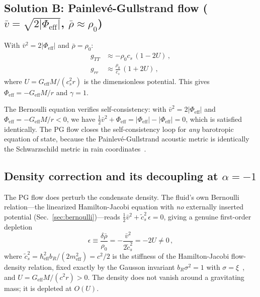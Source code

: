 \documentclass[12pt, a4paper]{article}
\newcommand{\Geff}{G_{\mathrm{eff}}}
\newcommand{\meff}{m_{\mathrm{eff}}}
\newcommand{\heff}{\hbar_{\mathrm{eff}}}
\newcommand{\rhob}{\bar{\rho}}
\newcommand{\vb}{\bar{v}}
\newcommand{\Phieff}{\Phi_{\mathrm{eff}}}
\begin{document}
\subsection{Solution B: Painlev\'{e}-Gullstrand flow \texorpdfstring{($\vb = \sqrt{2|\Phieff|}$, $\rhob \approx \rho_0$)}{(v = sqrt(2|Phi\_eff|), rho approx rho\_0)}}
\label{sec:solution_b}

With $\vb^2 = 2|\Phieff|$ and $\rhob = \rho_0$:
\begin{align}
    g_{TT} &\approx -\rho_0 c_s\,(1 - 2U)\,,\\
    g_{rr} &\approx \frac{\rho_0}{c_s}\,(1 + 2U)\,,
\end{align}
where $U = \Geff M/(c_s^2 r)$ is the dimensionless potential. This gives $\Phieff = -\Geff M/r$ and $\gamma = 1$.

The Bernoulli equation verifies self-consistency: with $\vb^2 = 2|\Phieff|$ and $\Phieff = -\Geff M/r < 0$, we have $\tfrac{1}{2}\vb^2 + \Phieff = |\Phieff| - |\Phieff| = 0$, which is satisfied identically. The PG flow closes the self-consistency loop for \emph{any} barotropic equation of state, because the Painlev\'{e}-Gullstrand acoustic metric is identically the Schwarzschild metric in rain coordinates~\cite{visser_1998,volovik_2003}.


\subsection{Density correction and its decoupling at \texorpdfstring{$\alpha=-1$}{alpha=-1}}
\label{sec:density_decoupling}

The PG flow does perturb the condensate density. The fluid's own Bernoulli relation---the linearized Hamilton-Jacobi equation with \emph{no} externally inserted potential (Sec.~\ref{sec:bernoulli})---reads $\tfrac{1}{2}\vb^2 + \tilde{c}_s^2\,\epsilon = 0$, giving a genuine first-order depletion
\begin{equation}
    \epsilon \equiv \frac{\delta\rhob}{\rho_0} = -\frac{\vb^2}{2\tilde{c}_s^2} = -2U \neq 0\,,
\label{eq:epsilon_depletion}
\end{equation}
where $\tilde{c}_s^2 = \heff^2 b_R/(2\meff^2) = c^2/2$ is the stiffness of the Hamilton-Jacobi flow-density relation, fixed exactly by the Gausson invariant $b_R\sigma^2=1$ with $\sigma=\xi$~\cite{kulangiev_2026e}, and $U = \Geff M/(c^2 r) > 0$. The density does not vanish around a gravitating mass; it is depleted at $O(U)$.
\end{document}
